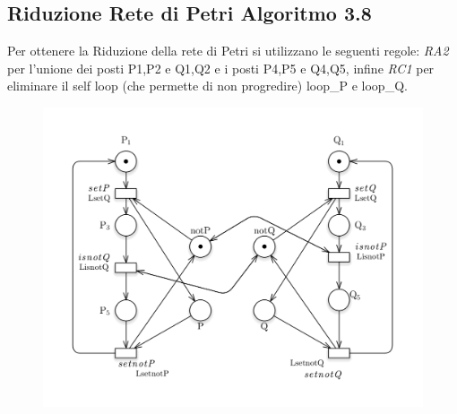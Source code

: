 \documentclass{article}
\begin{document}
\subsection{Riduzione Rete di Petri Algoritmo 3.8}
Per ottenere la Riduzione della rete di Petri si utilizzano le seguenti regole: \textit{RA2} per l'unione dei posti P1,P2 e Q1,Q2 e i posti P4,P5 e Q4,Q5, infine \textit{RC1} per eliminare il self loop (che permette di non progredire) loop\_P e loop\_Q.
\begin{figure}[h] 
\centering
\includegraphics[scale=0.5]{Riduzione3-8.png}
\end{figure}
\clearpage
\end{document}

